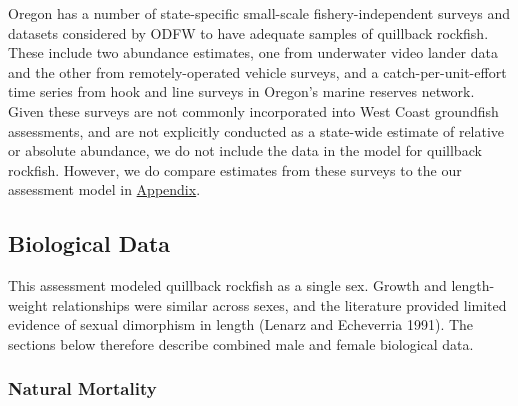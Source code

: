 \documentclass[11pt,
  english,
  a4paper,
]{article}
\begin{document}
\leavevmode\tagmcend\tagstructend\par


Oregon has a number of state-specific small-scale fishery-independent surveys and datasets considered by ODFW to have adequate samples of quillback rockfish. These include two abundance estimates, one from underwater video lander data and the other from remotely-operated vehicle surveys, and a catch-per-unit-effort time series from hook and line surveys in Oregon's marine reserves network. Given these surveys are not commonly incorporated into West Coast groundfish assessments, and are not explicitly conducted as a state-wide estimate of relative or absolute abundance, we do not include the data in the model for quillback rockfish. However, we do compare estimates from these surveys to the our assessment model in {\protect\hyperlink{append_b}{Appendix}\leavevmode\tagmcend\tagstructend}.

\leavevmode\tagmcend\tagstructend\par


\hypertarget{biological-data}{%
\subsection{Biological Data}\label{biological-data}}

\leavevmode\tagmcend\tagstructend


This assessment modeled quillback rockfish as a single sex. Growth and length-weight relationships were similar across sexes, and the literature provided limited evidence of sexual dimorphism in length {(Lenarz and Echeverria 1991)\leavevmode\tagmcend\tagstructend}. The sections below therefore describe combined male and female biological data.

\leavevmode\tagmcend\tagstructend\par


\hypertarget{natural-mortality}{%
\subsubsection{Natural Mortality}\label{natural-mortality}}
\end{document}
